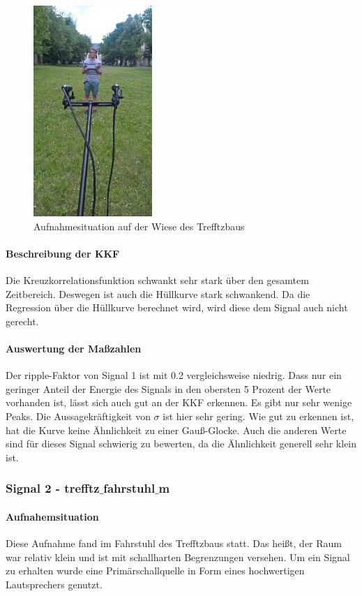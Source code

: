 \begin{figure}[ht!]
  \centering
  \includegraphics[width=0.4\textwidth]{img/wiese}
  \caption{Aufnahmesituation auf der Wiese des Trefftzbaus}
  \label{figure4}
\end{figure}

\paragraph{Beschreibung der KKF} Die Kreuzkorrelationsfunktion schwankt sehr stark über den gesamtem Zeitbereich. Deswegen ist auch die Hüllkurve stark schwankend. Da die Regression über die Hüllkurve berechnet wird, wird diese dem Signal auch nicht gerecht.
\paragraph{Auswertung der Maßzahlen}
Der ripple-Faktor von Signal 1 ist mit 0.2 vergleichsweise niedrig. Dass nur ein geringer Anteil der Energie des Signals in den obersten 5 Prozent der Werte vorhanden ist, lässt sich auch gut an der KKF erkennen. Es gibt nur sehr wenige Peaks. Die Aussagekräftigkeit von $\sigma$ ist hier sehr gering. Wie gut zu erkennen ist, hat die Kurve keine Ähnlichkeit zu einer Gauß-Glocke. Auch die anderen Werte sind für dieses Signal schwierig zu bewerten, da die Ähnlichkeit generell sehr klein ist.
\subsubsection{Signal 2 - trefftz$\_$fahrstuhl$\_$m}
\paragraph{Aufnahemsituation} Diese Aufnahme fand im Fahrstuhl des Trefftzbaus statt. Das heißt, der Raum war relativ klein und ist mit schallharten Begrenzungen versehen. Um ein Signal zu erhalten wurde eine Primärschallquelle in Form eines hochwertigen Lautsprechers genutzt.
